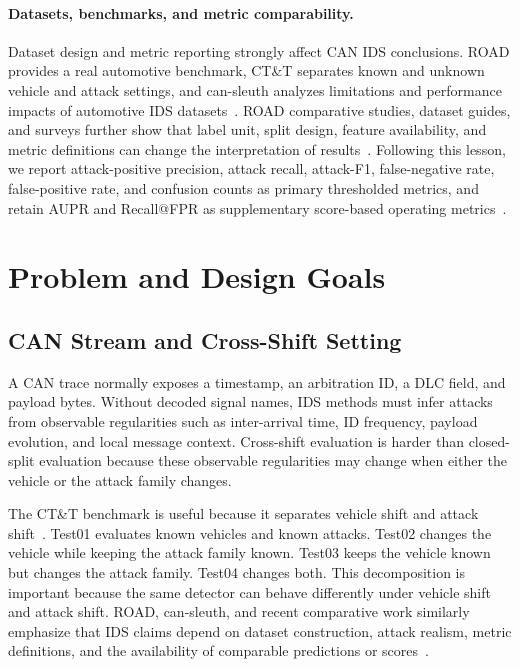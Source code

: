 \documentclass[runningheads]{llncs}
\begin{document}
\paragraph{Datasets, benchmarks, and metric comparability.}
Dataset design and metric reporting strongly affect CAN IDS conclusions. ROAD provides a real automotive benchmark, CT\&T separates known and unknown vehicle and attack settings, and can-sleuth analyzes limitations and performance impacts of automotive IDS datasets~\cite{verma2020road,lampe2024ctt,kidmose2024cansleuth}. ROAD comparative studies, dataset guides, and surveys further show that label unit, split design, feature availability, and metric definitions can change the interpretation of results~\cite{guerra2024road,verma2024dataguide,sharmin2024survey,althunayyan2026survey}. Following this lesson, we report attack-positive precision, attack recall, attack-F1, false-negative rate, false-positive rate, and confusion counts as primary thresholded metrics, and retain AUPR and Recall@FPR as supplementary score-based operating metrics~\cite{fawcett2006roc,davis2006pr,saito2015pr,ulvila2003ids,gu2006cid}.
\section{Problem and Design Goals}
\subsection{CAN Stream and Cross-Shift Setting}
A CAN trace normally exposes a timestamp, an arbitration ID, a DLC field, and payload bytes. Without decoded signal names, IDS methods must infer attacks from observable regularities such as inter-arrival time, ID frequency, payload evolution, and local message context. Cross-shift evaluation is harder than closed-split evaluation because these observable regularities may change when either the vehicle or the attack family changes.

The CT\&T benchmark is useful because it separates vehicle shift and attack shift~\cite{lampe2024ctt}. Test01 evaluates known vehicles and known attacks. Test02 changes the vehicle while keeping the attack family known. Test03 keeps the vehicle known but changes the attack family. Test04 changes both. This decomposition is important because the same detector can behave differently under vehicle shift and attack shift. ROAD, can-sleuth, and recent comparative work similarly emphasize that IDS claims depend on dataset construction, attack realism, metric definitions, and the availability of comparable predictions or scores~\cite{verma2020road,kidmose2024cansleuth,guerra2024road,sharmin2024survey}.
\end{document}
